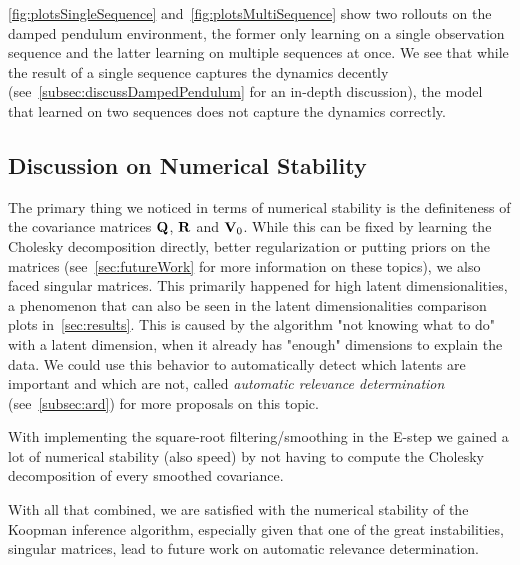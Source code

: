		\autoref{fig:plotsSingleSequence} and~\autoref{fig:plotsMultiSequence} show two rollouts on the damped pendulum environment, the former only learning on a single observation sequence and the latter learning on multiple sequences at once. We see that while the result of a single sequence captures the dynamics decently (see~\autoref{subsec:discussDampedPendulum} for an in-depth discussion), the model that learned on two sequences does not capture the dynamics correctly.

	\subsection{Discussion on Numerical Stability}
		\label{subsec:discussPerformanceNumerics}

		The primary thing we noticed in terms of numerical stability is the definiteness of the covariance matrices \(\boldsymbol{\mathrm{Q}}\), \(\boldsymbol{\mathrm{R}}\) and \(\boldsymbol{\mathrm{V}}_0\). While this can be fixed by learning the Cholesky decomposition directly, better regularization or putting priors on the matrices (see~\autoref{sec:futureWork} for more information on these topics), we also faced singular matrices. This primarily happened for high latent dimensionalities, a phenomenon that can also be seen in the latent dimensionalities comparison plots in~\autoref{sec:results}. This is caused by the algorithm "not knowing what to do" with a latent dimension, \ie when it already has "enough" dimensions to explain the data. We could use this behavior to automatically detect which latents are important and which are not, called \emph{automatic relevance determination} (see~\autoref{subsec:ard}) for more proposals on this topic.

		With implementing the square-root filtering/smoothing in the E-step we gained a lot of numerical stability (also speed) by not having to compute the Cholesky decomposition of every smoothed covariance.

		With all that combined, we are satisfied with the numerical stability of the Koopman inference algorithm, especially given that one of the great instabilities, singular matrices, lead to future work on automatic relevance determination.

